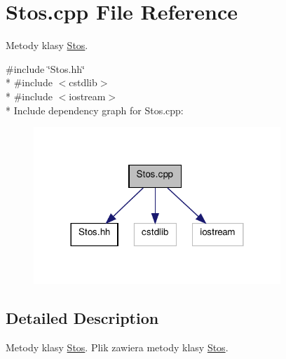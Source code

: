 \hypertarget{a00012}{\section{Stos.\-cpp File Reference}
\label{a00012}
}


Metody klasy \hyperlink{a00004}{Stos}.  


{\ttfamily \#include \char`\"{}Stos.\-hh\char`\"{}}\\*
{\ttfamily \#include $<$cstdlib$>$}\\*
{\ttfamily \#include $<$iostream$>$}\\*
Include dependency graph for Stos.\-cpp\-:\nopagebreak
\begin{figure}[H]
\begin{center}
\leavevmode
\includegraphics[width=264pt]{a00023}
\end{center}
\end{figure}


\subsection{Detailed Description}
Metody klasy \hyperlink{a00004}{Stos}. Plik zawiera metody klasy \hyperlink{a00004}{Stos}. 